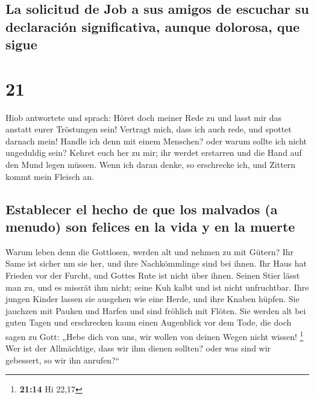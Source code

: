 \hypertarget{la-solicitud-de-job-a-sus-amigos-de-escuchar-su-declaraciuxf3n-significativa-aunque-dolorosa-que-sigue}{%
\subsection{La solicitud de Job a sus amigos de escuchar su declaración
significativa, aunque dolorosa, que
sigue}\label{la-solicitud-de-job-a-sus-amigos-de-escuchar-su-declaraciuxf3n-significativa-aunque-dolorosa-que-sigue}}

\hypertarget{section-20}{%
\section{21}\label{section-20}}

 Hiob antwortete und sprach:  Höret doch
meiner Rede zu und lasst mir das anstatt eurer Tröstungen sein!
 Vertragt mich, dass ich auch rede, und spottet darnach
mein!  Handle ich denn mit einem Menschen? oder warum
sollte ich nicht ungeduldig sein?  Kehret euch her zu mir;
ihr werdet erstarren und die Hand auf den Mund legen müssen.
 Wenn ich daran denke, so erschrecke ich, und Zittern
kommt mein Fleisch an.

\hypertarget{establecer-el-hecho-de-que-los-malvados-a-menudo-son-felices-en-la-vida-y-en-la-muerte}{%
\subsection{Establecer el hecho de que los malvados (a menudo) son
felices en la vida y en la
muerte}\label{establecer-el-hecho-de-que-los-malvados-a-menudo-son-felices-en-la-vida-y-en-la-muerte}}

 Warum leben denn die Gottlosen, werden alt und nehmen zu
mit Gütern?  Ihr Same ist sicher um sie her, und ihre
Nachkömmlinge sind bei ihnen.  Ihr Haus hat Frieden vor
der Furcht, und Gottes Rute ist nicht über ihnen.  Seinen
Stier lässt man zu, und es missrät ihm nicht; seine Kuh kalbt und ist
nicht unfruchtbar.  Ihre jungen Kinder lassen sie
ausgehen wie eine Herde, und ihre Knaben hüpfen.  Sie
jauchzen mit Pauken und Harfen und sind fröhlich mit Flöten.
 Sie werden alt bei guten Tagen und erschrecken kaum
einen Augenblick vor dem Tode,  die doch sagen zu Gott:
„Hebe dich von uns, wir wollen von deinen Wegen nicht wissen!
\footnote{\textbf{21:14} Hi 22,17}  Wer ist der
Allmächtige, dass wir ihm dienen sollten? oder was sind wir gebessert,
so wir ihn anrufen?{}``

